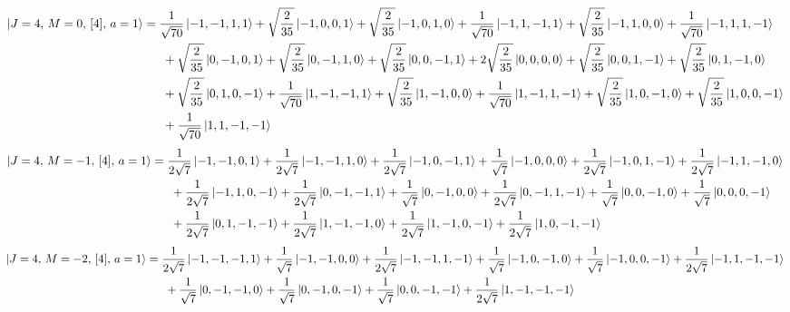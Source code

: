 \documentclass{article}
\begin{document}
{\small
\begin{equation*}
\begin{aligned}
\ket{J=4,\,M=0,\,[4],\,a=1} = \; &\frac{1}{\sqrt{70}} \ket{-1,-1,1,1} + \sqrt{\frac{2}{35}} \ket{-1,0,0,1} + \sqrt{\frac{2}{35}} \ket{-1,0,1,0} + \frac{1}{\sqrt{70}} \ket{-1,1,-1,1} + \sqrt{\frac{2}{35}} \ket{-1,1,0,0} + \frac{1}{\sqrt{70}} \ket{-1,1,1,-1} \\
  & \; + \sqrt{\frac{2}{35}} \ket{0,-1,0,1} + \sqrt{\frac{2}{35}} \ket{0,-1,1,0} + \sqrt{\frac{2}{35}} \ket{0,0,-1,1} + 2\sqrt{\frac{2}{35}} \ket{0,0,0,0} + \sqrt{\frac{2}{35}} \ket{0,0,1,-1} + \sqrt{\frac{2}{35}} \ket{0,1,-1,0} \\
  & \; + \sqrt{\frac{2}{35}} \ket{0,1,0,-1} + \frac{1}{\sqrt{70}} \ket{1,-1,-1,1} + \sqrt{\frac{2}{35}} \ket{1,-1,0,0} + \frac{1}{\sqrt{70}} \ket{1,-1,1,-1} + \sqrt{\frac{2}{35}} \ket{1,0,-1,0} + \sqrt{\frac{2}{35}} \ket{1,0,0,-1} \\
  & \; + \frac{1}{\sqrt{70}} \ket{1,1,-1,-1}
\end{aligned}
\end{equation*}}
{\small
\begin{equation*}
\begin{aligned}
\ket{J=4,\,M=-1,\,[4],\,a=1} = \; &\frac{1}{2\sqrt{7}} \ket{-1,-1,0,1} + \frac{1}{2\sqrt{7}} \ket{-1,-1,1,0} + \frac{1}{2\sqrt{7}} \ket{-1,0,-1,1} + \frac{1}{\sqrt{7}} \ket{-1,0,0,0} + \frac{1}{2\sqrt{7}} \ket{-1,0,1,-1} + \frac{1}{2\sqrt{7}} \ket{-1,1,-1,0} \\
  & \; + \frac{1}{2\sqrt{7}} \ket{-1,1,0,-1} + \frac{1}{2\sqrt{7}} \ket{0,-1,-1,1} + \frac{1}{\sqrt{7}} \ket{0,-1,0,0} + \frac{1}{2\sqrt{7}} \ket{0,-1,1,-1} + \frac{1}{\sqrt{7}} \ket{0,0,-1,0} + \frac{1}{\sqrt{7}} \ket{0,0,0,-1} \\
  & \; + \frac{1}{2\sqrt{7}} \ket{0,1,-1,-1} + \frac{1}{2\sqrt{7}} \ket{1,-1,-1,0} + \frac{1}{2\sqrt{7}} \ket{1,-1,0,-1} + \frac{1}{2\sqrt{7}} \ket{1,0,-1,-1}
\end{aligned}
\end{equation*}}
{\small
\begin{equation*}
\begin{aligned}
\ket{J=4,\,M=-2,\,[4],\,a=1} = \; &\frac{1}{2\sqrt{7}} \ket{-1,-1,-1,1} + \frac{1}{\sqrt{7}} \ket{-1,-1,0,0} + \frac{1}{2\sqrt{7}} \ket{-1,-1,1,-1} + \frac{1}{\sqrt{7}} \ket{-1,0,-1,0} + \frac{1}{\sqrt{7}} \ket{-1,0,0,-1} + \frac{1}{2\sqrt{7}} \ket{-1,1,-1,-1} \\
  & \; + \frac{1}{\sqrt{7}} \ket{0,-1,-1,0} + \frac{1}{\sqrt{7}} \ket{0,-1,0,-1} + \frac{1}{\sqrt{7}} \ket{0,0,-1,-1} + \frac{1}{2\sqrt{7}} \ket{1,-1,-1,-1}
\end{aligned}
\end{equation*}}
\end{document}
